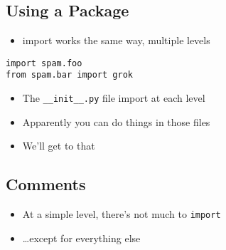 \documentclass[11pt]{article}
\begin{document}
\subsection*{Using a Package}
\label{sec:orgheadline14}
\begin{itemize}
\item import works the same way, multiple levels
\end{itemize}
\begin{verbatim}
import spam.foo
from spam.bar import grok
\end{verbatim}
\begin{itemize}
\item The \texttt{\_\_init\_\_.py} file import at each level
\item Apparently you can do things in those files
\item We'll get to that
\end{itemize}

\subsection*{Comments}
\label{sec:orgheadline15}
\begin{itemize}
\item At a simple level, there's not much to \texttt{import}
\item \ldots{}except for everything else
\end{itemize}
\end{document}
